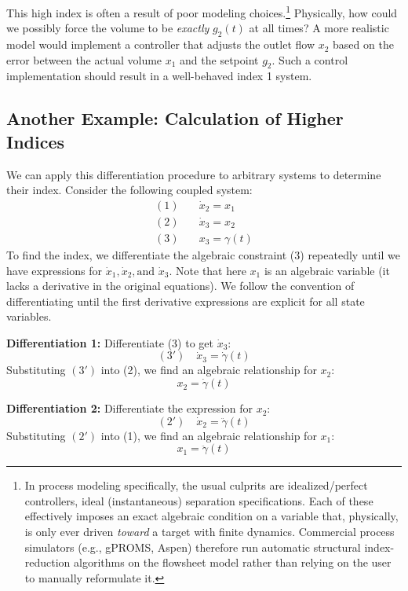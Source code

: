 This high index is often a result of poor modeling choices.\footnote{In process modeling specifically, the usual culprits are idealized/perfect controllers, ideal (instantaneous) separation specifications. Each of these effectively imposes an exact algebraic condition on a variable that, physically, is only ever driven \emph{toward} a target with finite dynamics. Commercial process simulators (e.g., gPROMS, Aspen) therefore run automatic structural index-reduction algorithms on the flowsheet model rather than relying on the user to manually reformulate it.} Physically, how could we possibly force the volume to be \emph{exactly} $g_2(t)$ at all times? A more realistic model would implement a controller that adjusts the outlet flow $x_2$ based on the error between the actual volume $x_1$ and the setpoint $g_2$. Such a control implementation should result in a well-behaved index 1 system.

\subsection{Another Example: Calculation of Higher Indices}

We can apply this differentiation procedure to arbitrary systems to determine their index. Consider the following coupled system:
\begin{align}
    (1) \quad & \dot{x}_2 = x_1 \\
    (2) \quad & \dot{x}_3 = x_2 \\
    (3) \quad & x_3 = \gamma(t)
\end{align}
To find the index, we differentiate the algebraic constraint (3) repeatedly until we have expressions for $\dot{x}_1, \dot{x}_2, \text{and } \dot{x}_3$. Note that here $x_1$ is an algebraic variable (it lacks a derivative in the original equations). We follow the convention of differentiating until the first derivative expressions are explicit for all state variables.

\textbf{Differentiation 1:} Differentiate (3) to get $\dot{x}_3$:
\begin{equation}
    (3') \quad \dot{x}_3 = \dot{\gamma}(t)
\end{equation}
Substituting $(3')$ into (2), we find an algebraic relationship for $x_2$:
\begin{equation}
    x_2 = \dot{\gamma}(t)
\end{equation}

\textbf{Differentiation 2:} Differentiate the expression for $x_2$:
\begin{equation}
    (2') \quad \dot{x}_2 = \ddot{\gamma}(t)
\end{equation}
Substituting $(2')$ into (1), we find an algebraic relationship for $x_1$:
\begin{equation}
    x_1 = \ddot{\gamma}(t)
\end{equation}

